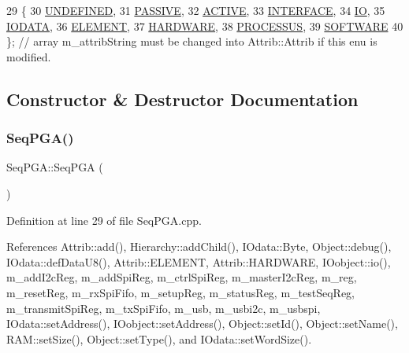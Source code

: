 \begin{DoxyCode}
29                 \{
30     \hyperlink{classAttrib_a69e171d7cc6417835a5a306d3c764235a3a8da2ab97dda18aebab196fe4100531}{UNDEFINED},
31     \hyperlink{classAttrib_a69e171d7cc6417835a5a306d3c764235a2bfb2af57b87031d190a05fe25dd92ed}{PASSIVE},
32     \hyperlink{classAttrib_a69e171d7cc6417835a5a306d3c764235a3b1fec929c0370d1436f2f06e298fb0d}{ACTIVE},
33     \hyperlink{classAttrib_a69e171d7cc6417835a5a306d3c764235aa27c16b480a369ea4d18b07b2516bbc7}{INTERFACE},
34     \hyperlink{classAttrib_a69e171d7cc6417835a5a306d3c764235a1420a5b8c0540b2af210b6975eded7f9}{IO},
35     \hyperlink{classAttrib_a69e171d7cc6417835a5a306d3c764235a0af3b0d0ac323c1704e6c69cf90add28}{IODATA},
36     \hyperlink{classAttrib_a69e171d7cc6417835a5a306d3c764235a7788bc5dd333fd8ce18562b269c9dab1}{ELEMENT},
37     \hyperlink{classAttrib_a69e171d7cc6417835a5a306d3c764235a61ceb22149f365f1780d18f9d1459423}{HARDWARE},
38     \hyperlink{classAttrib_a69e171d7cc6417835a5a306d3c764235a75250e29692496e73effca2c0330977f}{PROCESSUS},
39     \hyperlink{classAttrib_a69e171d7cc6417835a5a306d3c764235a103a67cd0b8f07ef478fa45d4356e27b}{SOFTWARE} 
40   \}; \textcolor{comment}{// array m\_attribString must be changed into Attrib::Attrib if this enu is modified. }
\end{DoxyCode}


\subsection{Constructor \& Destructor Documentation}
\mbox{\label{classSeqPGA_a032240de5048a496dcce57ac28e10f65}} 
\subsubsection{\texorpdfstring{Seq\+P\+G\+A()}{SeqPGA()}}
{\footnotesize\ttfamily Seq\+P\+G\+A\+::\+Seq\+P\+GA (\begin{DoxyParamCaption}{ }\end{DoxyParamCaption})}



Definition at line 29 of file Seq\+P\+G\+A.\+cpp.



References Attrib\+::add(), Hierarchy\+::add\+Child(), I\+Odata\+::\+Byte, Object\+::debug(), I\+Odata\+::def\+Data\+U8(), Attrib\+::\+E\+L\+E\+M\+E\+NT, Attrib\+::\+H\+A\+R\+D\+W\+A\+RE, I\+Oobject\+::io(), m\+\_\+add\+I2c\+Reg, m\+\_\+add\+Spi\+Reg, m\+\_\+ctrl\+Spi\+Reg, m\+\_\+master\+I2c\+Reg, m\+\_\+reg, m\+\_\+reset\+Reg, m\+\_\+rx\+Spi\+Fifo, m\+\_\+setup\+Reg, m\+\_\+status\+Reg, m\+\_\+test\+Seq\+Reg, m\+\_\+transmit\+Spi\+Reg, m\+\_\+tx\+Spi\+Fifo, m\+\_\+usb, m\+\_\+usbi2c, m\+\_\+usbspi, I\+Odata\+::set\+Address(), I\+Oobject\+::set\+Address(), Object\+::set\+Id(), Object\+::set\+Name(), R\+A\+M\+::set\+Size(), Object\+::set\+Type(), and I\+Odata\+::set\+Word\+Size().


